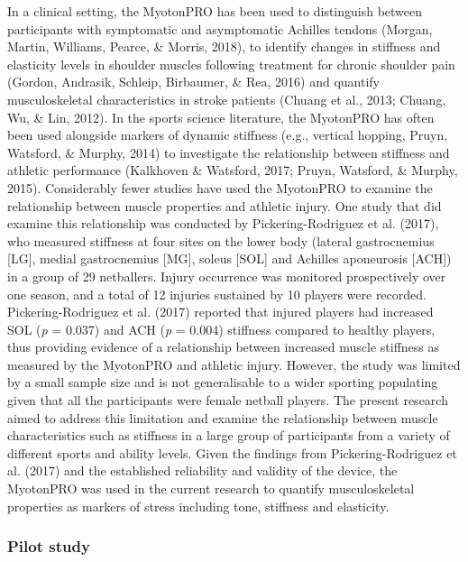 \documentclass[man,floatsintext]{apa6}
\begin{document}
In a clinical setting, the MyotonPRO has been used to distinguish between participants with symptomatic and asymptomatic Achilles tendons (Morgan, Martin, Williams, Pearce, \& Morris, 2018), to identify changes in stiffness and elasticity levels in shoulder muscles following treatment for chronic shoulder pain (Gordon, Andrasik, Schleip, Birbaumer, \& Rea, 2016) and quantify musculoskeletal characteristics in stroke patients (Chuang et al., 2013; Chuang, Wu, \& Lin, 2012).
In the sports science literature, the MyotonPRO has often been used alongside markers of dynamic stiffness (e.g., vertical hopping, Pruyn, Watsford, \& Murphy, 2014) to investigate the relationship between stiffness and athletic performance (Kalkhoven \& Watsford, 2017; Pruyn, Watsford, \& Murphy, 2015).
Considerably fewer studies have used the MyotonPRO to examine the relationship between muscle properties and athletic injury.
One study that did examine this relationship was conducted by Pickering-Rodriguez et al. (2017), who measured stiffness at four sites on the lower body (lateral gastrocnemius {[}LG{]}, medial gastrocnemius {[}MG{]}, soleus {[}SOL{]} and Achilles aponeurosis {[}ACH{]}) in a group of 29 netballers.
Injury occurrence was monitored prospectively over one season, and a total of 12 injuries sustained by 10 players were recorded.
Pickering-Rodriguez et al. (2017) reported that injured players had increased SOL (\emph{p} = 0.037) and ACH (\emph{p} = 0.004) stiffness compared to healthy players, thus providing evidence of a relationship between increased muscle stiffness as measured by the MyotonPRO and athletic injury.
However, the study was limited by a small sample size and is not generalisable to a wider sporting populating given that all the participants were female netball players.
The present research aimed to address this limitation and examine the relationship between muscle characteristics such as stiffness in a large group of participants from a variety of different sports and ability levels.
Given the findings from Pickering-Rodriguez et al. (2017) and the established reliability and validity of the device, the MyotonPRO was used in the current research to quantify musculoskeletal properties as markers of stress including tone, stiffness and elasticity.

\hypertarget{pilot-study}{%
\subsubsection{Pilot study}\label{pilot-study}}
\end{document}
